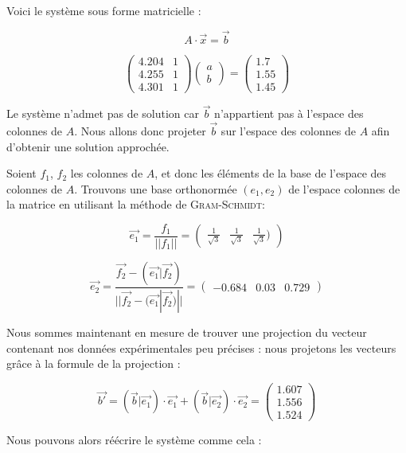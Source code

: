 Voici le système sous forme matricielle :

$$A \cdot \vec{x} = \vec{b}$$

$$
\begin{pmatrix}
4.204 & 1\\
4.255 & 1 \\
4.301 & 1
\end{pmatrix} 
\begin{pmatrix}
a\\
b
\end{pmatrix} 
= 
\begin{pmatrix}
1.7\\
1.55\\
1.45
\end{pmatrix}
$$
	

Le système n'admet pas de solution car $\vec{b}$ n'appartient pas à l'espace des colonnes de $A$. Nous
allons donc projeter $\vec{b}$ sur l'espace des colonnes de $A$ afin d'obtenir une solution approchée.

Soient $f_1$, $f_2$ les colonnes de $A$, et donc les éléments de la base de l'espace des colonnes de $A$.
Trouvons une base orthonormée $(e_1, e_2)$ de l'espace colonnes de la matrice en utilisant
la méthode de \textsc{Gram-Schmidt}:

$$ \vec {e_1} = \frac{f_1}{||f_1||} = \begin{pmatrix} \frac{1}{\sqrt{3}} & \frac{1}{\sqrt{3}} &\frac{1}{\sqrt{3}}) \end{pmatrix}$$

$$ \vec {e_2} = \frac{ \vec{f_2} - (\vec{e_1}|\vec{f_2})}{||\vec{f_2} - (\vec{e_1}|\vec{f_2})||} = \begin{pmatrix}
-0.684 & 0.03 & 0.729 \end{pmatrix} $$

Nous sommes maintenant en mesure de trouver une projection du vecteur contenant nos données expérimentales
peu précises :
nous projetons les vecteurs grâce à la formule de la projection :


$$
\vec{b'}
=
(\vec{b}|\vec{e_1}) \cdot \vec{e_1} + (\vec{b}|\vec{e_2}) \cdot \vec{e_2}
=
\begin{pmatrix}
1.607\\
1.556\\
1.524
\end{pmatrix}
$$

Nous pouvons alors réécrire le système comme cela :

